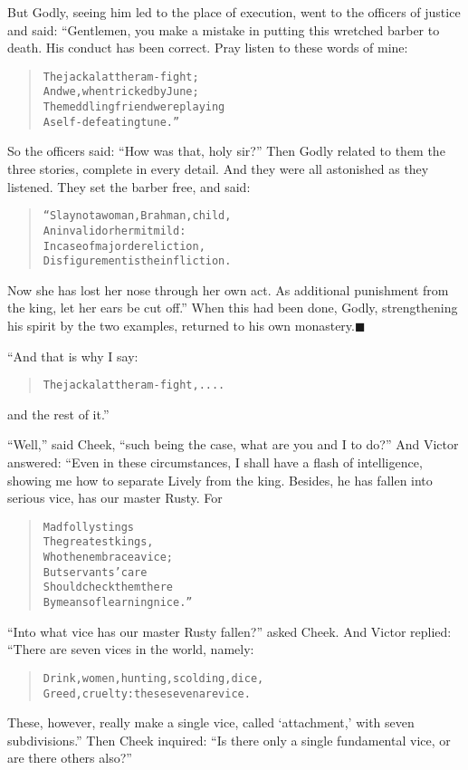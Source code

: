 \documentclass[article, twoside, 14pt]{memoir}
\newcommand{\qed}{\hfill \ensuremath{\blacksquare}}
\renewenvironment{verbatim}{%
\begin{quote}%
\vskip -10pt%
\begin{alltt}\normalfont\large}{\end{alltt}%
\end{quote}%
\vskip -10pt
} %
\begin{document}
But Godly, seeing him led to the place of execution, went to the
officers of justice and said: “Gentlemen, you make a mistake in
putting this wretched barber to death. His conduct has been
correct. Pray listen to these words of mine:

\begin{verbatim}
The jackal at the ram-fight;
And we, when tricked by June;
The meddling friend{\textemdash}were playing
A self-defeating tune.”
\end{verbatim}
So the officers said: ``How was that, holy sir?'' Then Godly
related to them the three stories, complete in every detail. And
they were all astonished as they listened. They set the barber
free, and said:

\begin{verbatim}
“Slay not a woman, Brahman, child,
An invalid or hermit mild:
In case of major dereliction,
Disfigurement is the infliction.
\end{verbatim}
Now she has lost her nose through her own act. As additional
punishment from the king, let her ears be cut off.” When this had
been done, Godly, strengthening his spirit by the two examples,
returned to his own monastery.\hyperref[s7]{\qed}

“And that is why I say:

\begin{verbatim}
The jackal at the ram-fight, ....
\end{verbatim}
and the rest of it.”

``Well,'' said Cheek,
``such being the case, what are you and I to do?'' And Victor
answered: “Even in these circumstances, I shall have a flash of
intelligence, showing me how to separate Lively from the king.
Besides, he has fallen into serious vice, has our master Rusty.
For

\begin{verbatim}
Mad folly stings
The greatest kings,
    Who then embrace a vice;
But servants' care
Should check them there
    By means of learning nice.”
\end{verbatim}
``Into what vice has our master Rusty fallen?'' asked Cheek. And
Victor replied: “There are seven vices in the world, namely:

\begin{verbatim}
Drink, women, hunting, scolding, dice,
Greed, cruelty: these seven are vice.
\end{verbatim}
These, however, really make a single vice, called `attachment,'
with seven subdivisions.” Then Cheek inquired:
``Is there only a single fundamental vice, or are there others also?''
\end{document}
